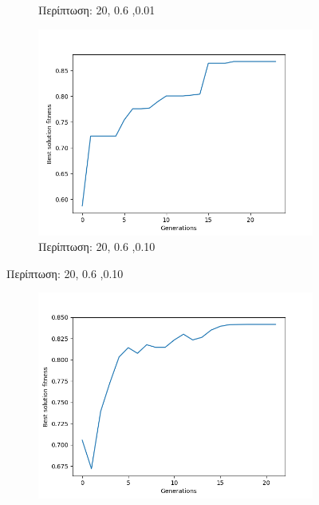 \documentclass[12pt,a4paper]{article}
\begin{document}
\begin{enumerate}
\begin{figure}[H]
\begin{subfigure}[h]{0.7\textwidth}
                         \caption*{Περίπτωση: 20, 0.6 ,0.01}
                     \end{subfigure}
                     \hfill
                     \begin{subfigure}[h]{0.7\textwidth}
                         \centering
                         \includegraphics[width=\textwidth]{images/3s.png}
                         \caption*{Περίπτωση: 20, 0.6 ,0.10}
                     \end{subfigure}
                 \end{figure}
                 \begin{figure}[H]
                     \centering
                     \begin{subfigure}[h]{0.7\textwidth}
                         \centering
                         \includegraphics[width=\textwidth]{images/4s.png}

\end{subfigure}
\end{figure}
\end{enumerate}
\end{document}
